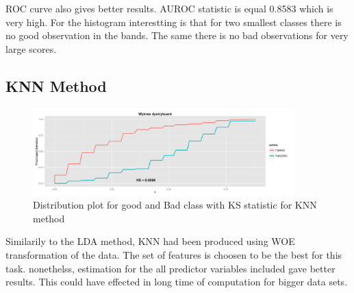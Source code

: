 \documentclass[10pt]{article}\usepackage[]{graphicx}\usepackage[]{color}
\begin{document}
ROC curve also gives better results. AUROC statistic is equal 0.8583 which is very high. For the histogram interestting is that for two smallest classes there is no good observation in the bands. The same there is no bad observations for very large scores.



\clearpage

\subsection{KNN Method}

\begin{figure}[h!]
  \centering
  \includegraphics[width=0.9\textwidth]{Plots/KNN_KS}
  \caption[Close up of \textit{Hemidactylus} sp.]
   {Distribution plot for good and Bad class with KS statistic for KNN method}
\end{figure}

Similarily to the LDA method, KNN had been produced using WOE transformation of the data. The set of features is choosen to be the best for this task. nonethelss, estimation for the all predictor variables included gave better results. This could have effected in long time of computation for bigger data sets. 
\end{document}
